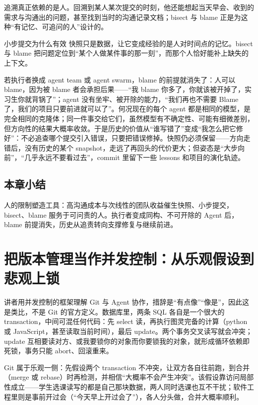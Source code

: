 \documentclass[a4paper]{article}
\begin{document}
追溯真正依赖的是人。回溯到某人某次提交的时刻，他还能想起当天早会、收到的需求与沟通出的问题，甚至找到当时的沟通记录文档；bisect 与 blame 正是为这种“有记忆、可追问的人”设计的。

\begin{knowledgebox}{小步提交为什么有效}
快照只是数据，让它变成经验的是人对时间点的记忆。bisect 与 blame 把问题定位到“某个人做某件事的那一刻”，而那个人恰好能补上缺失的上下文。
\end{knowledgebox}

若执行者换成 agent team 或 agent swarm，blame 的前提就消失了：人可以 blame，因为被 blame 者会承担后果——“我 blame 你多了，你就该被开掉了，实习生你就背锅了”；agent 没有坐牢、被开除的能力，“我们再也不需要 Blame 了，我们的项目只要前进就可以了”。何况现在的每个 agent 都是相同的模型，是完全相同的克隆体；同一件事交给它们，虽然模型有不确定性、可能有细微差别，但方向性的结果大概率收敛。于是历史的价值从“谁写错了”变成“我怎么把它修好”：不必追查哪个提交引入错误，只要把错误修掉。快照仍必须保留——方向走错后，没有历史的某个 snapshot，走远了再回头的代价更大；但姿态是“大步向前”，“几乎永远不要看过去”，commit 里留下一些 lessons 和项目的演化轨迹。

\subsection{本章小结}

人的限制塑造工具：高沟通成本与次线性的团队收益催生快照、小步提交，bisect、blame 服务于可问责的人。执行者变成同构、不可开除的 Agent 后，blame 前提消失，历史从追责转向支撑修复与继续前进。

\section{把版本管理当作并发控制：从乐观假设到悲观上锁}

讲者用并发控制的框架理解 Git 与 Agent 协作，措辞是“有点像”“像是”，因此这是类比，不是 Git 的官方定义。数据库里，两条 SQL 各自是一个很大的 transaction，中间可混任何代码：先 select 读，再执行图灵完备的计算（python 或 JavaScript，甚至读取当前时间），最后 update。两个事务交叉读写就会冲突；update 互相要读对方、或我要锁你的对象而你要锁我的对象，就形成循环依赖即死锁，事务只能 abort、回滚重来。

Git 属于乐观一侧：先假设两个 transaction 不冲突，让双方各自往前跑，到合并（merge 或 rebase）时再检测，并相信“大概率不会产生冲突”。该假设靠访问局部性成立——学生选课读写的都是自己那块数据，两人同时选课也互不干扰；软件工程里则是事前开过会（“今天早上开过会了”），各人分头做，合并大概率顺利。
\end{document}
